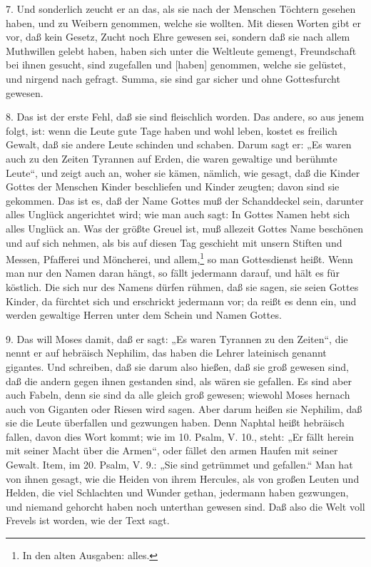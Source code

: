 7. Und sonderlich zeucht er an das, als sie nach der Menschen Töchtern gesehen haben, und zu Weibern genommen, welche sie wollten. Mit diesen Worten gibt er vor, daß kein Gesetz, Zucht noch Ehre gewesen sei, sondern daß sie nach allem Muthwillen gelebt haben, haben sich unter die Weltleute gemengt, Freundschaft bei ihnen gesucht, sind zugefallen und [haben] genommen, welche sie gelüstet, und nirgend nach gefragt. Summa, sie sind gar sicher und ohne Gottesfurcht gewesen.

8. Das ist der erste Fehl, daß sie sind fleischlich worden. Das andere, so aus jenem folgt, ist: wenn die Leute gute Tage haben und wohl leben, kostet es freilich Gewalt, daß sie andere Leute schinden und schaben. Darum sagt er: „Es waren auch zu den Zeiten Tyrannen auf Erden, die waren gewaltige und berühmte Leute“, und zeigt auch an, woher sie kämen, nämlich, wie gesagt, daß die Kinder Gottes der Menschen Kinder beschliefen und Kinder zeugten; davon sind sie gekommen. Das ist es, daß der Name Gottes muß der Schanddeckel sein, darunter alles Unglück angerichtet wird; wie man auch sagt: In Gottes Namen hebt sich alles Unglück an. Was der größte Greuel ist, muß allezeit Gottes Name beschönen und auf sich nehmen, als bis auf diesen Tag geschieht mit unsern Stiften und Messen, Pfafferei und Möncherei, und allem,\footnote{In den alten Ausgaben: alles.} so man Gottesdienst heißt. Wenn man nur den Namen daran hängt, so fällt jedermann darauf, und hält es für köstlich. Die sich nur des Namens dürfen rühmen, daß sie sagen, sie seien Gottes Kinder, da fürchtet sich und erschrickt jedermann vor; da reißt es denn ein, und werden gewaltige Herren unter dem Schein und Namen Gottes.

9. Das will Moses damit, daß er sagt: „Es waren Tyrannen zu den Zeiten“, die nennt er auf hebräisch Nephilim, das haben die Lehrer lateinisch genannt gigantes. Und schreiben, daß sie darum also hießen, daß sie groß gewesen sind, daß die andern gegen ihnen gestanden sind, als wären sie gefallen. Es sind aber auch Fabeln, denn sie sind da alle gleich groß gewesen; wiewohl Moses hernach auch von Giganten oder Riesen wird sagen. Aber darum heißen sie Nephilim, daß sie die Leute überfallen und gezwungen haben. Denn Naphtal heißt hebräisch fallen, davon dies Wort kommt; wie im 10. Psalm, V. 10., steht: „Er fällt herein mit seiner Macht über die Armen“, oder fället den armen Haufen mit seiner Gewalt. Item, im 20. Psalm, V. 9.: „Sie sind getrümmet und gefallen.“ Man hat von ihnen gesagt, wie die Heiden von ihrem Hercules, als von großen Leuten und Helden, die viel Schlachten und Wunder gethan, jedermann haben gezwungen, und niemand gehorcht haben noch unterthan gewesen sind. Daß also die Welt voll Frevels ist worden, wie der Text sagt.

